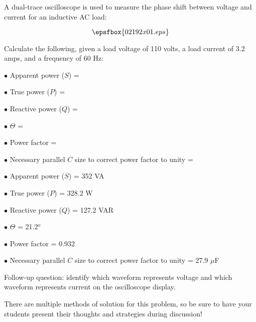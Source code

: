 


A dual-trace oscilloscope is used to measure the phase shift between voltage and current for an inductive AC load:

$$\epsfbox{02192x01.eps}$$

Calculate the following, given a load voltage of 110 volts, a load current of 3.2 amps, and a frequency of 60 Hz:

\medskip
\goodbreak
\item{$\bullet$} Apparent power ($S$) =
\item{$\bullet$} True power ($P$) =
\item{$\bullet$} Reactive power ($Q$) =
\item{$\bullet$} $\Theta$ =
\item{$\bullet$} Power factor =
\item{$\bullet$} Necessary parallel $C$ size to correct power factor to unity = 
\medskip







\medskip
\goodbreak
\item{$\bullet$} Apparent power ($S$) = 352 VA
\item{$\bullet$} True power ($P$) = 328.2 W
\item{$\bullet$} Reactive power ($Q$) = 127.2 VAR
\item{$\bullet$} $\Theta$ = 21.2$^{o}$
\item{$\bullet$} Power factor = 0.932
\item{$\bullet$} Necessary parallel $C$ size to correct power factor to unity = 27.9 $\mu$F
\medskip

\vskip 10pt

Follow-up question: identify which waveform represents voltage and which waveform represents current on the oscilloscope display.







There are multiple methods of solution for this problem, so be sure to have your students present their thoughts and strategies during discussion!




